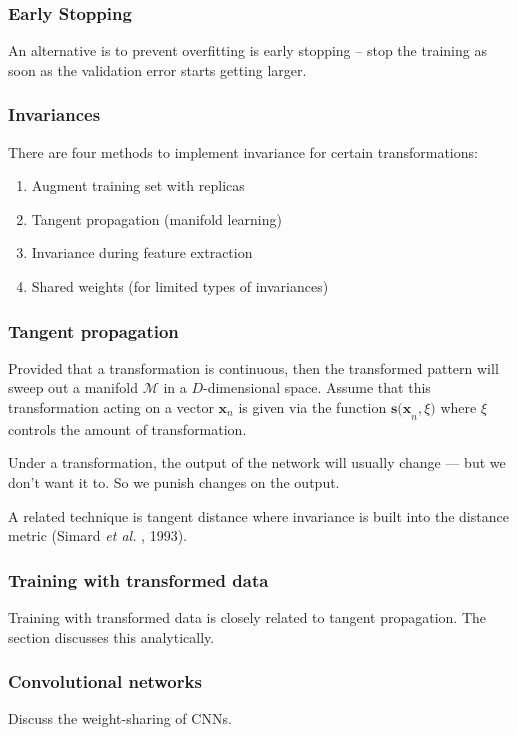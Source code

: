 \documentclass[a4paper]{article}
\newcommand{\ea}{\textit{et al. }}
\newcommand{\mb}{\mathbf}
\newcommand{\lnote}[1]{#1\reversemarginpar\marginpar{{\textit{#1}}}}
\begin{document}
\subsubsection{Early Stopping}
An alternative is to prevent overfitting is early stopping \--- stop the training as soon as the validation error starts getting larger.

\subsubsection{Invariances}
There are four methods to implement invariance for certain transformations:
\begin{enumerate}
\item Augment training set with replicas
\item Tangent propagation (manifold learning)
\item Invariance during feature extraction
\item Shared weights (for limited types of invariances)
\end{enumerate}
%
%
%

\subsubsection{Tangent propagation}
Provided that a transformation is continuous, then the transformed pattern will sweep out a manifold $\mathcal{M}$ in a $D$-dimensional space. Assume that this transformation acting on a vector $\mb{x}_n$ is given via the function $\mb{s(x}_n,\xi)$ where $\xi$ controls the amount of transformation.

Under a transformation, the output of the network will usually change \---- but we don't want it to. So we punish changes on the output.

A related technique is \lnote{tangent distance} where invariance is built into the distance metric (Simard \ea, 1993).

\subsubsection{Training with transformed data}
Training with transformed data is closely related to tangent  propagation. The section discusses this analytically.

\subsubsection{Convolutional networks}
Discuss the weight-sharing of CNNs.
\end{document}
